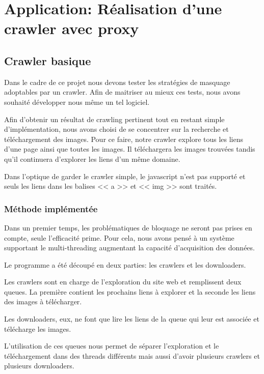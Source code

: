 \documentclass[hideweeklyreports,noposter]{polytech/polytech}
\begin{document}
\part{Application: Réalisation d'une crawler avec proxy}
	\chapter{Crawler basique}
		Dans le cadre de ce projet nous devons tester les stratégies de masquage adoptables par un crawler.
		Afin de maitriser au mieux ces tests, nous avons souhaité développer nous même un tel logiciel.
		
		Afin d'obtenir un résultat de crawling pertinent tout en restant simple d'implémentation, nous avons choisi de se concentrer sur la recherche et téléchargement des images.
		Pour ce faire, notre crawler explore tous les liens d'une page ainsi que toutes les images.
		Il téléchargera les images trouvées tandis qu'il continuera d'explorer les liens d'un même domaine.
		
		Dans l'optique de garder le crawler simple, le javascript n'est pas supporté et seuls les liens dans les balises << a >> et << img >> sont traités.
		
		\section{Méthode implémentée}
			Dans un premier temps, les problématiques de bloquage ne seront pas prises en compte, seule l'efficacité prime.
			Pour cela, nous avons pensé à un système supportant le multi-threading augmentant la capacité d'acquisition des données.
			
			Le programme a été découpé en deux parties: les crawlers et les downloaders.
			
			Les crawlers sont en charge de l'exploration du site web et remplissent deux queues.
			La première contient les prochains liens à explorer et la seconde les liens des images à télécharger.
			
			Les downloaders, eux, ne font que lire les liens de la queue qui leur est associée et télécharge les images.
			
			L'utilisation de ces queues nous permet de séparer l'exploration et le téléchargement dans des threads différents mais aussi d'avoir plusieurs crawlers et plusieurs downloaders.
			
\end{document}
